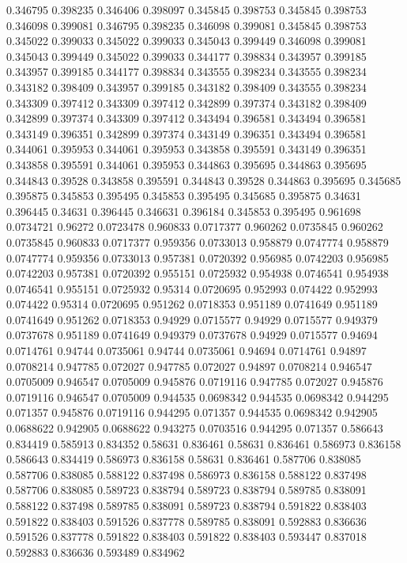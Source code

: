 0.346795 0.398235
0.346406 0.398097
0.345845 0.398753
0.345845 0.398753
0.346098 0.399081
0.346795 0.398235
0.346098 0.399081
0.345845 0.398753
0.345022 0.399033
0.345022 0.399033
0.345043 0.399449
0.346098 0.399081
0.345043 0.399449
0.345022 0.399033
0.344177 0.398834
0.343957 0.399185
0.343957 0.399185
0.344177 0.398834
0.343555 0.398234
0.343555 0.398234
0.343182 0.398409
0.343957 0.399185
0.343182 0.398409
0.343555 0.398234
0.343309 0.397412
0.343309 0.397412
0.342899 0.397374
0.343182 0.398409
0.342899 0.397374
0.343309 0.397412
0.343494 0.396581
0.343494 0.396581
0.343149 0.396351
0.342899 0.397374
0.343149 0.396351
0.343494 0.396581
0.344061 0.395953
0.344061 0.395953
0.343858 0.395591
0.343149 0.396351
0.343858 0.395591
0.344061 0.395953
0.344863 0.395695
0.344863 0.395695
0.344843 0.39528
0.343858 0.395591
0.344843 0.39528
0.344863 0.395695
0.345685 0.395875
0.345853 0.395495
0.345853 0.395495
0.345685 0.395875
0.34631 0.396445
0.34631 0.396445
0.346631 0.396184
0.345853 0.395495
0.961698 0.0734721
0.96272 0.0723478
0.960833 0.0717377
0.960262 0.0735845
0.960262 0.0735845
0.960833 0.0717377
0.959356 0.0733013
0.958879 0.0747774
0.958879 0.0747774
0.959356 0.0733013
0.957381 0.0720392
0.956985 0.0742203
0.956985 0.0742203
0.957381 0.0720392
0.955151 0.0725932
0.954938 0.0746541
0.954938 0.0746541
0.955151 0.0725932
0.95314 0.0720695
0.952993 0.074422
0.952993 0.074422
0.95314 0.0720695
0.951262 0.0718353
0.951189 0.0741649
0.951189 0.0741649
0.951262 0.0718353
0.94929 0.0715577
0.94929 0.0715577
0.949379 0.0737678
0.951189 0.0741649
0.949379 0.0737678
0.94929 0.0715577
0.94694 0.0714761
0.94744 0.0735061
0.94744 0.0735061
0.94694 0.0714761
0.94897 0.0708214
0.947785 0.072027
0.947785 0.072027
0.94897 0.0708214
0.946547 0.0705009
0.946547 0.0705009
0.945876 0.0719116
0.947785 0.072027
0.945876 0.0719116
0.946547 0.0705009
0.944535 0.0698342
0.944535 0.0698342
0.944295 0.071357
0.945876 0.0719116
0.944295 0.071357
0.944535 0.0698342
0.942905 0.0688622
0.942905 0.0688622
0.943275 0.0703516
0.944295 0.071357
0.586643 0.834419
0.585913 0.834352
0.58631 0.836461
0.58631 0.836461
0.586973 0.836158
0.586643 0.834419
0.586973 0.836158
0.58631 0.836461
0.587706 0.838085
0.587706 0.838085
0.588122 0.837498
0.586973 0.836158
0.588122 0.837498
0.587706 0.838085
0.589723 0.838794
0.589723 0.838794
0.589785 0.838091
0.588122 0.837498
0.589785 0.838091
0.589723 0.838794
0.591822 0.838403
0.591822 0.838403
0.591526 0.837778
0.589785 0.838091
0.592883 0.836636
0.591526 0.837778
0.591822 0.838403
0.591822 0.838403
0.593447 0.837018
0.592883 0.836636
0.593489 0.834962
